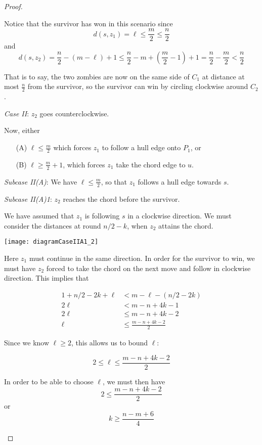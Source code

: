 \documentclass[letterpaper, 10pt]{article}
\begin{document}
\begin{proof}
\begin{proofpart}
Notice that the survivor has won in this scenario since
\[ d(s,z_1) = \ell \leq \frac{m}{2} \leq \frac{n}{2} \]
and
\[ d(s,z_2) = \frac{n}{2} - (m - \ell) + 1 \leq \frac{n}{2} - m + \left(\frac{m}{2} -1\right) +1 = \frac{n}{2} - \frac{m}{2} < \frac{n}{2} \]

That is to say, the two zombies are now on the same side of $C_1$ at distance at most $\frac{n}{2}$
from the survivor, so the survivor can win by circling clockwise around $C_2$.

\emph{Case II}: $z_2$ goes counterclockwise.

Now, either
\begin{enumerate}
\item[(A)] $\ell \leq \frac{m}{2}$
    which forces $z_1$ to follow a hull edge onto $P_1$, or
\item[(B)] $\ell \geq \frac{m}{2} + 1$,
    which forces $z_1$ take the chord edge to $u$.
\end{enumerate}

\emph{Subcase II(A)}: We have $\ell \leq \frac{m}{2}$, so that $z_1$ follows a hull edge towards $s$.

\emph{Subcase II(A)1}: $z_2$ reaches the chord before the survivor.

We have assumed that $z_1$ is following $s$ in a clockwise direction. We must consider the distances at
round $n/2 - k$, when $z_2$ attains the chord.

\begin{center}
\texttt{[image: diagramCaseIIA1\_2]}
\end{center}

Here $z_1$ must continue in the same direction. In order for the survivor to win, we must have
$z_2$ forced to take the chord on the next move and follow in clockwise direction. This implies that

\begin{align*}
1 + n/2-2k + \ell & < m - \ell - (n/2-2k)   \\
2\ell             & < m -n +4k -1           \\
2\ell             & \leq m - n +4k -2       \\
\ell              & \leq \frac{m-n+4k-2}{2}
\end{align*}

Since we know $\ell \geq 2$, this allows us to bound $\ell$:

\[ 2 \leq \ell \leq \frac{m-n+4k-2}{2} \]

In order to be able to choose $\ell$, we must then have
\[ 2 \leq \frac{m -n + 4k -2}{2} \]
or
\[ k \geq \frac{n-m+6}{4} \]


\end{proofpart}
\end{proof}
\end{document}
